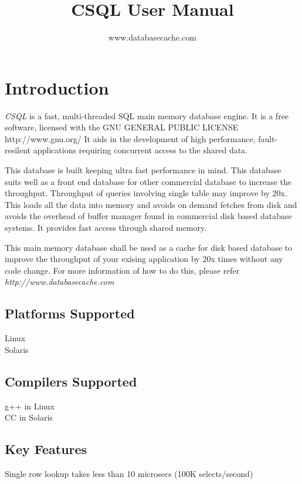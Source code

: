 \documentclass[12pt]{article}
\begin{document}
         

\title{CSQL User Manual } 
\author{www.databasecache.com} 
\date{} 
\maketitle 

\tableofcontents
\pagebreak

\section{Introduction}
\label{Introduction}

\emph {CSQL} is a fast, multi-threaded SQL main memory database engine. It is a free software, licensed with the GNU GENERAL PUBLIC LICENSE http://www.gnu.org/
It aids in the development of high performance, fault-resilent applications requiring concurrent access to the shared data. 

This database is built keeping ultra fast performance in mind. This database suits well as a front end database for other commercial database to increase the throughput. Throughput of queries involving single table may improve by 20x. This loads all the data into memory and avoids on demand fetches from disk and avoids the overhead of buffer manager found in commercial disk based database systems. It provides fast access through shared memory.

This main memory database shall be used as a cache for disk based database to improve the throughput of your exising application by 20x times without any code change. For more information of how to do this, please refer \emph{http://www.databasecache.com}
\subsection{Platforms Supported}
\label{psupported}
Linux \\
Solaris 

\subsection{Compilers Supported}
\label{csupported}
g++ in Linux \\
CC in Solaris

\subsection{Key Features}
\label{keyfeatures}
Single row lookup takes less than 10 microsecs (100K selects/second)
\end{document}
